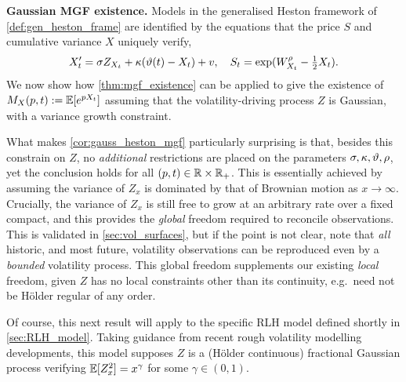 \vspace{3mm}\textbf{Gaussian MGF existence.} Models in the generalised Heston framework of \autoref{def:gen_heston_frame} are identified by the equations that the price $S$ and cumulative variance $X$ uniquely verify,
\begin{equation}\label{eq:model_summary3}
    X'_t = \sigma Z_{X_t} + \kappa(\vartheta(t) - X_t) + v,\quad S_t=\exp(W^\rho_{X_t}-\tfrac12 X_t).
\end{equation}
We now show how \autoref{thm:mgf_existence} can be applied to give the existence of $M_X(p,t):=\mathbb{E}[e^{p X_t}]$ assuming that the volatility-driving process $Z$ is Gaussian, with a variance growth constraint.

What makes \autoref{cor:gauss_heston_mgf} particularly surprising is that, besides this constrain on $Z$, no \emph{additional} restrictions are placed on the parameters $\sigma, \kappa,\vartheta,\rho$, yet the conclusion holds for all $(p,t)\in\mathbb{R}\times\mathbb{R}_+$. This is essentially achieved by assuming the variance of $Z_x$ is dominated by that of Brownian motion as $x\to\infty$. Crucially, the variance of $Z_x$ is still free to grow at an arbitrary rate over a fixed compact, and this provides the \emph{global} freedom required to reconcile observations. This is validated in \autoref{sec:vol_surfaces}, but if the point is not clear, note that \emph{all} historic, and most future, volatility observations can be reproduced even by a \emph{bounded} volatility process. This global freedom supplements our existing \emph{local} freedom, given $Z$ has no local constraints other than its continuity, e.g.~need not be H\"older regular of any order.

Of course, this next result will apply to the specific RLH model defined shortly in \autoref{sec:RLH_model}. Taking guidance from recent rough volatility modelling developments, this model supposes $Z$ is a (H\"older continuous) fractional Gaussian process verifying $\mathbb{E}[Z^2_x]=x^{\gamma}$ for some $\gamma\in(0,1)$.

